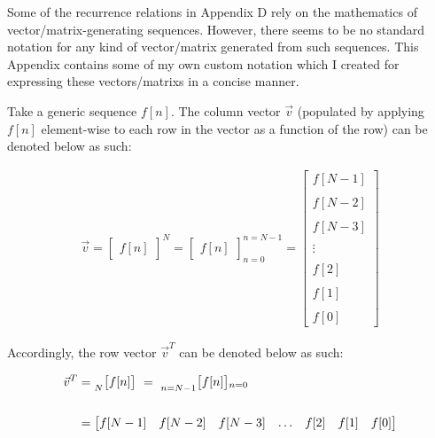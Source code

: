 \documentclass{article}
\begin{document}
\hspace{5mm} Some of the recurrence relations in Appendix D rely on the mathematics of vector/matrix-generating sequences. However, there seems to be no standard notation for any kind of vector/matrix generated from such sequences. This Appendix contains some of my own custom notation which I created for expressing these vectors/matrixs in a concise manner.\newline 

Take a generic sequence $f[n]$. The column vector $\vec{v}$ (populated by applying $f[n]$ element-wise to each row in the vector as a function of the row) can be denoted below as such:

\begin{align*}
    \vec{v} = \begin{bmatrix} f[n] \end{bmatrix}^{N}
            = \begin{bmatrix} f[n] \end{bmatrix}^{n=N - 1}_{n=0}
            = \begin{bmatrix}
                    f[N - 1] \\ \\
                    f[N - 2] \\ \\
                    f[N - 3] \\ \\
                      \vdots \\ \\
                    f[    2] \\ \\
                    f[    1] \\ \\
                    f[    0] 
                \end{bmatrix}
  \end{align*}

Accordingly, the row vector $\vec{v}^{T}$ can be denoted below as such:

\begin{align*}
    \vec{v}^{T}&=   \prescript{}{N}{\begin{bmatrix} f[n] \end{bmatrix}} \ 
                = \ \prescript{}{n=N - 1}{\begin{bmatrix} f[n] \end{bmatrix}}_{n=0} \\ \\
               &= \begin{bmatrix} f[N - 1] & f[N - 2] & f[N - 3] & \ldots & f[2] & f[1] & f[0] \end{bmatrix} \\
  \end{align*} 
\end{document}

